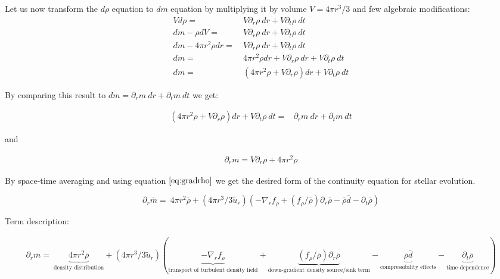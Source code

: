 \documentclass[10pt,paper=a4]{report}
\newcommand{\eht}{\overline}
\newcommand{\fht}{\widetilde}
\begin{document}
\noindent
Let us now transform the $d \rho$ equation to $d m$ equation by multiplying it by volume $V = 4 \pi r^3/3$ and few algebraic modifications: \\

\begin{align}
V d\rho = & \ V \partial_r \rho \ d r + V \partial_t \rho \ dt \nonumber \\
d m - \rho d V = & \ V \partial_r \rho \ d r + V \partial_t \rho \ dt \nonumber \\
d m - 4 \pi r^2 \rho d r = & \ V \partial_r \rho \ d r + V \partial_t \rho \ dt \nonumber \\
d m  = & \ 4 \pi r^2 \rho d r + V \partial_r \rho \ d r + V \partial_t \rho \ dt \nonumber \\
d m  = & \ (4 \pi r^2 \rho + V \partial_r \rho) d r + V \partial_t \rho \ dt \nonumber
\end{align}

\noindent
By comparing this result to $d m = \partial_r m \ d r + \partial_t m \ dt$ we get:

\begin{align}
(4 \pi r^2 \rho + V \partial_r \rho) d r + V \partial_t \rho \ dt = & \partial_r m \ d r + \partial_t m \ dt \nonumber
\end{align}

\noindent
and

\begin{align}
\partial_r m = V \partial_r \rho + 4 \pi r^2 \rho
\end{align}

\noindent
By space-time averaging and using equation $\ref{eq:gradrho}$ we get the desired form of the continuity equation for stellar evolution.

\begin{equation}
\partial_r \eht{m} = \ 4\pi r^2 \eht{\rho} + (4 \pi r^3 / 3 \fht{u}_r) \left(-\nabla_r f_\rho + (f_\rho / \eht{\rho})\partial_r \eht{\rho} - \eht{\rho}\eht{d} - \partial_t \eht{\rho}   \right)
\end{equation}

\noindent
Term description:

\begin{align}
\partial_r \eht{m} = \ \underbrace{4\pi r^2 \eht{\rho}}_\text{density distribution} + (4 \pi r^3 / 3 \fht{u}_r) (\underbrace{-\nabla_r f_\rho}_\text{transport of turbulent density field} + \underbrace{(f_\rho / \eht{\rho})\partial_r \eht{\rho}}_\text{down-gradient density source/sink term} - \underbrace{\eht{\rho}\eht{d}}_\text{compressibility effects} - \underbrace{\partial_t \eht{\rho}}_\text{time-dependence} )
\end{align}
\end{document}
